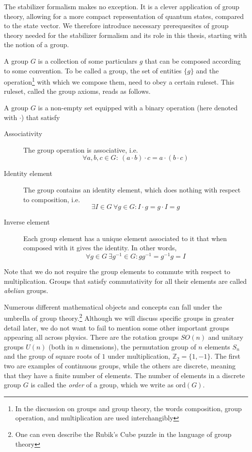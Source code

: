 The stabilizer formalism makes no exception. It is a clever application of
group theory, allowing for a more compact representation of quantum states,
compared to the state vector. We therefore introduce necessary prerequesites of
group theory needed for the stabilizer formalism and its role in this thesis,
starting with the notion of a group.

A group $G$ is a collection of some particulars $g$ that can be composed
according to some convention. To be called a group, the set of entities
$\{g\}$ and the operation\footnote{In the discussion on groups and group
  theory, the words composition, group operation, and multiplication are used
interchangibly} with which we compose them, need to obey a certain
ruleset. This ruleset, called the group axioms, reads as follows.

\begin{defn}[Group]\label{defn:group}
  A group $G$ is a non-empty set equipped with a binary operation (here denoted
  with $\cdot$) that satisfy
  \begin{description}
    \item[Associativity] The group operation is associative, i.e.
      $$\forall a,b,c \in G:\ (a\cdot b) \cdot c = a \cdot
      (b \cdot c)$$
    \item[Identity element] The group contains an identity element, which does
      nothing with respect to composition, i.e.
      $$\exists I\in G \ \forall g \in G : I\cdot g = g \cdot I = g$$
    \item[Inverse element] Each group element has a unique element associated
      to it that when composed with it gives the identity. In other words,
      $$\forall g \in G \ \exists g^{-1} \in G : g g^{-1} = g^{-1} g = I $$
  \end{description}
\end{defn}

Note that we do not require the group elements to commute with respect to
multiplication. Groups that satisfy commutativity for all their elements are
called \emph{abelian} groups.

Numerous different mathematical objects and concepts can fall under the
umbrella of group theory.\footnote{One can even describe the Rubik's Cube
puzzle in the language of group theory} Although we will discuss specific
groups in greater detail later, we do not want to fail to mention some other
important groups appearing all across physics. There are the rotation groups
$SO(n)$ and unitary groups $U(n)$ (both in $n$ dimensions), the permutation
group of $n$ elements $S_n$ and the group of square roots of $1$ under
multiplication, $\mathbb{Z}_2 = \{1, -1\}$.  The first two are examples of
continuous groups, while the others are discrete, meaning that they have a
finite number of elements. The number of elements in a discrete group $G$ is
called the \emph{order} of a group, which we write as $\mathrm{ord}(G)$.

